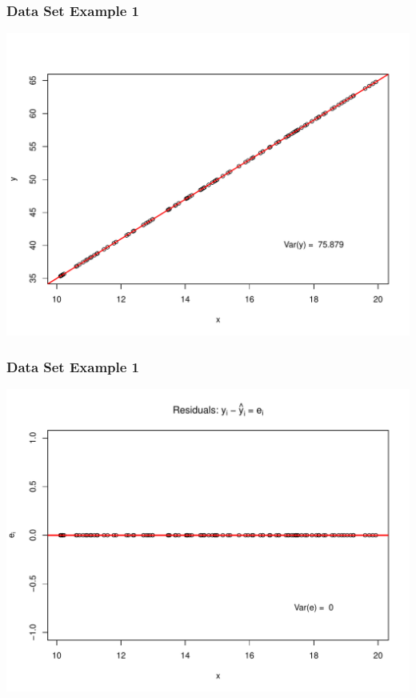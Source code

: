 \documentclass[handout]{beamer}
\begin{document}
\begin{frame}[fragile]
\frametitle{Data Set Example 1}

\begin{center}
\includegraphics[width=\textwidth]{figure/plot1}
\end{center}

\end{frame}


\begin{frame}[fragile]
\frametitle{Data Set Example 1}

\begin{center}
\includegraphics[width=\textwidth]{figure/plot2}
\end{center}

\end{frame}
\end{document}

